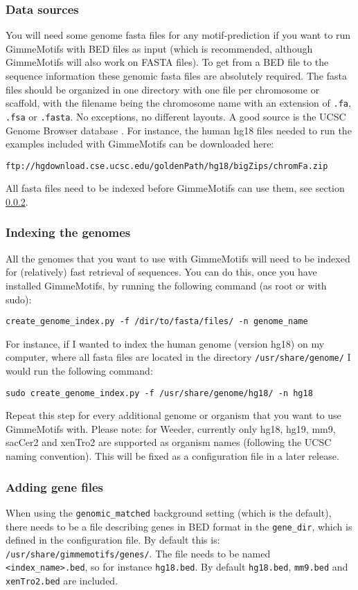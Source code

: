 \documentclass[11pt]{article}
\begin{document}
\subsubsection{Data sources}
You will need some genome fasta files for any motif-prediction if you want to run GimmeMotifs with BED files as input (which is recommended, although GimmeMotifs will also work on FASTA files). To get from a BED file to the sequence information these genomic fasta files are absolutely required. The fasta files should be organized in one directory with one file per chromosome or scaffold, with the filename being the chromosome name with an extension of \texttt{.fa}, \texttt{.fsa} or \texttt{.fasta}. No exceptions, no different layouts. A good source is the UCSC Genome Browser database \cite{rhead_ucsc_2010}. For instance, the human hg18 files needed to run the examples included with GimmeMotifs can be downloaded here:
\begin{verbatim}
ftp://hgdownload.cse.ucsc.edu/goldenPath/hg18/bigZips/chromFa.zip
 \end{verbatim}
All fasta files need to be indexed before GimmeMotifs can use them, see section \ref{sec:indexing}.

\subsubsection{Indexing the genomes}
\label{sec:indexing}
All the genomes that you want to use with GimmeMotifs will need to be indexed for (relatively) fast retrieval of sequences. You can do this, once you have installed GimmeMotifs, by running the following command (as root or with sudo):
\begin{verbatim}
create_genome_index.py -f /dir/to/fasta/files/ -n genome_name
\end{verbatim}
For instance, if I wanted to index the human genome (version hg18) on my computer, where all fasta files are located in the directory \texttt{/usr/share/genome/} I would run the following command:
\begin{verbatim}
sudo create_genome_index.py -f /usr/share/genome/hg18/ -n hg18
\end{verbatim}
Repeat this step for every additional genome or organism that you want to use GimmeMotifs with. Please note: for Weeder, currently only hg18, hg19, mm9, sacCer2 and xenTro2 are supported as organism names (following the UCSC naming convention). This will be fixed as a configuration file in a later release.

\subsubsection{Adding gene files}
When using the \texttt{genomic\_matched} background setting (which is the default), there needs to be a file describing genes in BED format in the \texttt{gene\_dir}, which is defined in the configuration file. By default this is: \texttt{/usr/share/gimmemotifs/genes/}. The file needs to be named \texttt{<index\_name>.bed}, so for instance \texttt{hg18.bed}. By default \texttt{hg18.bed}, \texttt{mm9.bed} and \texttt{xenTro2.bed} are included.
\end{document}
